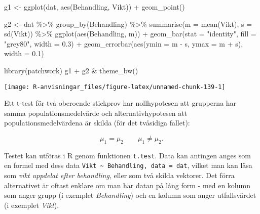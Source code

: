 \documentclass[
]{book}
\newenvironment{Shaded}{\begin{snugshade}}{\end{snugshade}}
\newcommand{\AttributeTok}[1]{\textcolor[rgb]{0.77,0.63,0.00}{#1}}
\newcommand{\FloatTok}[1]{\textcolor[rgb]{0.00,0.00,0.81}{#1}}
\newcommand{\FunctionTok}[1]{\textcolor[rgb]{0.00,0.00,0.00}{#1}}
\newcommand{\NormalTok}[1]{#1}
\newcommand{\OtherTok}[1]{\textcolor[rgb]{0.56,0.35,0.01}{#1}}
\newcommand{\SpecialCharTok}[1]{\textcolor[rgb]{0.00,0.00,0.00}{#1}}
\newcommand{\StringTok}[1]{\textcolor[rgb]{0.31,0.60,0.02}{#1}}
\theoremstyle{definition}
\theoremstyle{definition}
\theoremstyle{definition}
\theoremstyle{definition}
\theoremstyle{remark}
\begin{document}
\begin{Shaded}
\begin{Highlighting}[]
\NormalTok{g1 }\OtherTok{\textless{}{-}} \FunctionTok{ggplot}\NormalTok{(dat, }\FunctionTok{aes}\NormalTok{(Behandling, Vikt)) }\SpecialCharTok{+}
  \FunctionTok{geom\_point}\NormalTok{()}

\NormalTok{g2 }\OtherTok{\textless{}{-}}\NormalTok{ dat }\SpecialCharTok{\%\textgreater{}\%} 
  \FunctionTok{group\_by}\NormalTok{(Behandling) }\SpecialCharTok{\%\textgreater{}\%} 
  \FunctionTok{summarise}\NormalTok{(}\AttributeTok{m =} \FunctionTok{mean}\NormalTok{(Vikt), }\AttributeTok{s =} \FunctionTok{sd}\NormalTok{(Vikt)) }\SpecialCharTok{\%\textgreater{}\%} 
  \FunctionTok{ggplot}\NormalTok{(}\FunctionTok{aes}\NormalTok{(Behandling, m)) }\SpecialCharTok{+}
  \FunctionTok{geom\_bar}\NormalTok{(}\AttributeTok{stat =} \StringTok{"identity"}\NormalTok{, }\AttributeTok{fill =} \StringTok{"grey80"}\NormalTok{, }\AttributeTok{width =} \FloatTok{0.3}\NormalTok{) }\SpecialCharTok{+}
  \FunctionTok{geom\_errorbar}\NormalTok{(}\FunctionTok{aes}\NormalTok{(}\AttributeTok{ymin =}\NormalTok{ m }\SpecialCharTok{{-}}\NormalTok{ s, }\AttributeTok{ymax =}\NormalTok{ m }\SpecialCharTok{+}\NormalTok{ s), }\AttributeTok{width =} \FloatTok{0.1}\NormalTok{)}

\FunctionTok{library}\NormalTok{(patchwork)}
\NormalTok{g1 }\SpecialCharTok{+}\NormalTok{ g2 }\SpecialCharTok{\&} \FunctionTok{theme\_bw}\NormalTok{()}
\end{Highlighting}
\end{Shaded}

\begin{center}\texttt{[image: R-anvisningar\_files/figure-latex/unnamed-chunk-139-1]} \end{center}

Ett t-test för två oberoende stickprov har nollhypotesen att grupperna har samma populationsmedelvärde och alternativhypotesen att populationsmedelvärdena är skilda (för det tvåsidiga fallet):

\[\mu_1 = \mu_2 \qquad \mu_1 \neq \mu_2.\]

Testet kan utföras i R genom funktionen \texttt{t.test}. Data kan antingen anges som en formel med dess data \texttt{Vikt\ \textasciitilde{}\ Behandling,\ data\ =\ dat}, vilket man kan läsa som \emph{vikt uppdelat efter behandling}, eller som två skilda vektorer. Det förra alternativet är oftast enklare om man har datan på lång form - med en kolumn som anger grupp (i exemplet \emph{Behandling}) och en kolumn som anger utfallsvärdet (i exemplet \emph{Vikt}).
\end{document}
